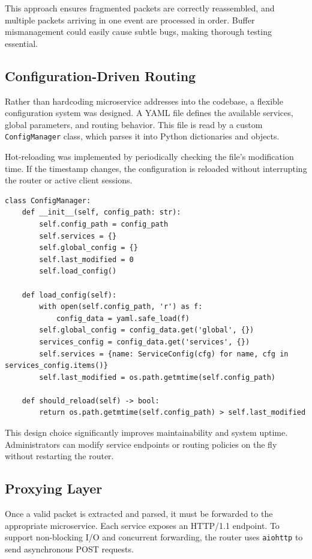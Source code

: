 This approach ensures fragmented packets are correctly reassembled, and multiple packets arriving in one event are processed in order. Buffer mismanagement could easily cause subtle bugs, making thorough testing essential.

\subsection{Configuration-Driven Routing}

Rather than hardcoding microservice addresses into the codebase, a flexible configuration system was designed. A YAML file defines the available services, global parameters, and routing behavior. This file is read by a custom \texttt{ConfigManager} class, which parses it into Python dictionaries and objects.

Hot-reloading was implemented by periodically checking the file’s modification time. If the timestamp changes, the configuration is reloaded without interrupting the router or active client sessions.

\begin{lstlisting}[breaklines=true,basicstyle=\small\ttfamily,frame=single]
class ConfigManager:
    def __init__(self, config_path: str):
        self.config_path = config_path
        self.services = {}
        self.global_config = {}
        self.last_modified = 0
        self.load_config()

    def load_config(self):
        with open(self.config_path, 'r') as f:
            config_data = yaml.safe_load(f)
        self.global_config = config_data.get('global', {})
        services_config = config_data.get('services', {})
        self.services = {name: ServiceConfig(cfg) for name, cfg in services_config.items()}
        self.last_modified = os.path.getmtime(self.config_path)

    def should_reload(self) -> bool:
        return os.path.getmtime(self.config_path) > self.last_modified
\end{lstlisting}

This design choice significantly improves maintainability and system uptime. Administrators can modify service endpoints or routing policies on the fly without restarting the router.

\subsection{Proxying Layer}

Once a valid packet is extracted and parsed, it must be forwarded to the appropriate microservice. Each service exposes an HTTP/1.1 endpoint. To support non-blocking I/O and concurrent forwarding, the router uses \texttt{aiohttp} to send asynchronous POST requests.

